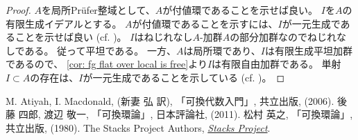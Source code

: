 \documentclass[uplatex]{jsarticle}
\theoremstyle{definition}
\theoremstyle{plain}
\begin{document}
\begin{proof}
  \(A\)を局所Pr\"{u}fer整域として、\(A\)が付値環であることを示せば良い。
  \(I\)を\(A\)の有限生成イデアルとする。
  \(A\)が付値環であることを示すには、\(I\)が一元生成であることを示せば良い
  (cf. \cite[\href{https://stacks.math.columbia.edu/tag/090Q}{Tag 090Q}]{stacks-project})。
  \(I\)はねじれなし\(A\)-加群\(A\)の部分加群なのでねじれなしである。
  従って平坦である。
  一方、\(A\)は局所環であり、\(I\)は有限生成平坦加群であるので、
  \autoref{cor: fg flat over local is free}より\(I\)は有限自由加群である。
  単射\(I\subset A\)の存在は、\(I\)が一元生成であることを示している
  (cf. \cite[演習2.11]{AM})。
\end{proof}




\begin{thebibliography}{9}
  M. Atiyah, I. Macdonald, (新妻 弘 訳),
  「可換代数入門」, 共立出版, (2006).
  後藤 四郎, 渡辺 敬一,
  「可換環論」, 日本評論社, (2011).
  松村 英之,
  「可換環論」, 共立出版, (1980).
  The Stacks Project Authors,
  \href{https://stacks.math.columbia.edu/}{\textit{Stacks Project}}.
\end{thebibliography}
\end{document}
